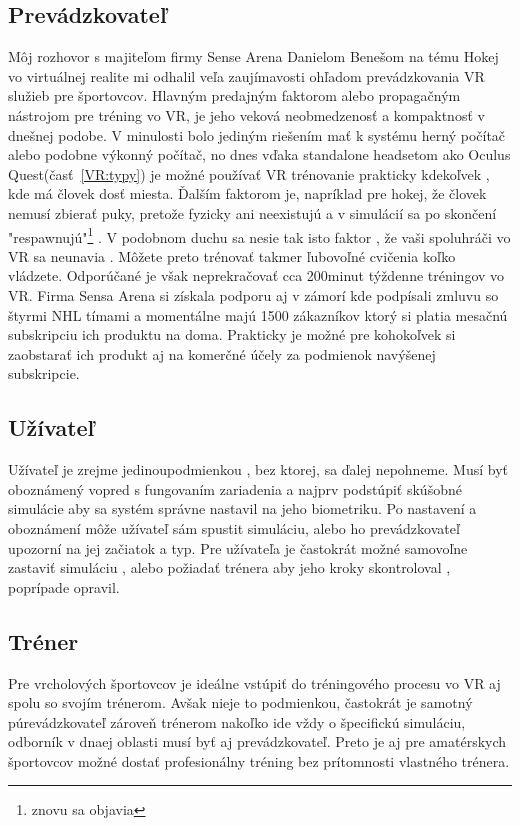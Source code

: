 \documentclass[10pt,twoside,slovak,a4paper]{article}										%
\begin{document}
\subsection{Prevádzkovateľ}\label{PR:boss}
Môj rozhovor s majiteľom firmy Sense Arena Danielom Benešom na tému Hokej vo virtuálnej realite mi odhalil veľa zaujímavosti ohľadom prevádzkovania VR služieb pre športovcov. Hlavným predajným faktorom alebo propagačným nástrojom pre tréning vo VR, je jeho veková neobmedzenosť a kompaktnosť v dnešnej podobe. V minulosti bolo jediným riešením mať k systému herný počítač alebo podobne výkonný počítač, no dnes vďaka standalone headsetom ako Oculus Quest(časť~\ref{VR:typy}) je možné používať VR trénovanie prakticky kdekoľvek , kde má človek dosť miesta.  Ďalším faktorom je, napríklad pre hokej, že človek nemusí zbierať puky, pretože fyzicky ani neexistujú a v simulácií sa po skončení "respawnujú"\footnote{znovu sa objavia} . V podobnom duchu sa nesie tak isto faktor , že vaši spoluhráči vo VR sa neunavia . Môžete preto trénovať takmer ľubovoľné cvičenia koľko vládzete. Odporúčané je však neprekračovať cca 200minut týždenne tréningov vo VR. Firma Sensa Arena si získala podporu aj v zámorí kde podpísali zmluvu so štyrmi NHL tímami a momentálne majú 1500 zákazníkov ktorý si platia mesačnú subskripciu ich produktu na doma. Prakticky je možné pre kohokoľvek si zaobstarať ich produkt aj na komerčné účely za podmienok navýšenej subskripcie.

\subsection {Užívateľ} \label{PR:user}
Užívateľ je zrejme jedinoupodmienkou , bez ktorej, sa ďalej nepohneme. Musí byť oboznámený vopred s fungovaním zariadenia a najprv podstúpiť skúšobné simulácie aby sa systém správne nastavil na jeho biometriku. Po nastavení a oboznámení môže užívateľ sám spustit simuláciu, alebo ho prevádzkovateľ upozorní na jej začiatok a typ. Pre užívateľa je častokrát možné samovoľne zastaviť simuláciu , alebo požiadať trénera aby jeho kroky skontroloval , poprípade opravil.

\subsection {Tréner} \label{PR:trendo}
Pre vrcholových športovcov je ideálne vstúpiť do tréningového procesu vo VR aj spolu so svojím trénerom. Avšak nieje to podmienkou, častokrát je samotný púrevádzkovateľ zároveň trénerom nakoľko ide vždy o špecifickú simuláciu, odborník v dnaej oblasti musí byť aj prevádzkovateľ. Preto je aj pre amatérskych športovcov možné dostať profesionálny tréning bez prítomnosti vlastného trénera.
\end{document}
